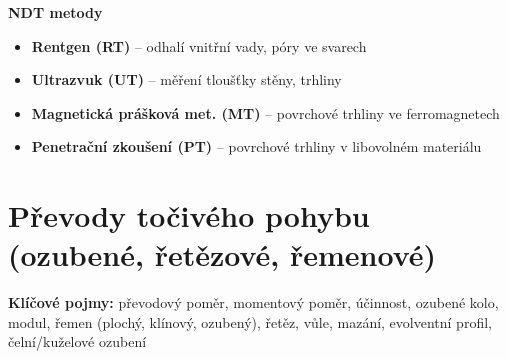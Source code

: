 \documentclass[a4paper,10pt]{article}
\begin{document}
\begin{vysvetlenibox}
\textbf{NDT metody}
\begin{itemize}[noitemsep, leftmargin=1.4em, topsep=4pt]
    \item \textbf{Rentgen (RT)} -- odhalí vnitřní vady, póry ve svarech
    \item \textbf{Ultrazvuk (UT)} -- měření tloušťky stěny, trhliny
    \item \textbf{Magnetická prášková met. (MT)} -- povrchové trhliny ve ferromagnetech
    \item \textbf{Penetrační zkoušení (PT)} -- povrchové trhliny v libovolném materiálu
\end{itemize}
\end{vysvetlenibox}

\section{Převody točivého pohybu (ozubené, řetězové, řemenové)}

\begin{pojmybox}
\textbf{Klíčové pojmy:}
převodový poměr, momentový poměr, účinnost, ozubené kolo,
modul, řemen (plochý, klínový, ozubený), řetěz,
vůle, mazání, evolventní profil, čelní/kuželové ozubení
\end{pojmybox}
\end{document}
